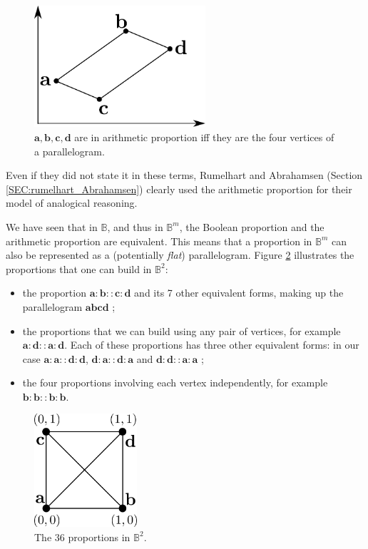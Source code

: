 \begin{figure}[!h]
\centering
  \includegraphics[width=2.5in]{figures/arithmetic_proportion.pdf}
  \caption{$\mathbf{a}, \mathbf{b}, \mathbf{c}, \mathbf{d}$
  are in arithmetic proportion iff they are the four vertices of a
  parallelogram.}
\label{FIG:arithmetic_proportion}
\end{figure}

Even if they did not state it in these terms, Rumelhart and Abrahamsen (Section
\ref{SEC:rumelhart_Abrahamsen}) clearly used the arithmetic proportion for their model of
analogical reasoning.

We have seen that in $\mathbb{B}$, and thus in $\mathbb{B}^m$, the Boolean
proportion and the arithmetic proportion are equivalent. This means that a
proportion in $\mathbb{B}^m$ can also be represented as a (potentially
\textit{flat}) parallelogram.
Figure \ref{FIG:proportions_in_B2} illustrates the proportions that one can
build in $\mathbb{B}^2$:
\begin{itemize}
  \item the proportion $\mathbf{a}: \mathbf{b} :: \mathbf{c} : \mathbf{d}$ and
    its 7 other equivalent forms, making up the parallelogram
    $\mathbf{a}\mathbf{b}\mathbf{c}\mathbf{d}$ ;
  \item the proportions that we can build using any pair of vertices, for
    example $\mathbf{a} : \mathbf{d} :: \mathbf{a} : \mathbf{d}$. Each of these
    proportions has three other equivalent forms: in our case $\mathbf{a} :
    \mathbf{a} :: \mathbf{d} : \mathbf{d}$, $\mathbf{d} : \mathbf{a} ::
    \mathbf{d} : \mathbf{a}$ and $\mathbf{d} : \mathbf{d} :: \mathbf{a} :
    \mathbf{a}$ ;
  \item the four proportions involving each vertex independently, for example
    $\mathbf{b}:\mathbf{b}::\mathbf{b}:\mathbf{b}$.
\end{itemize}

\begin{figure}[!h]
\centering
\includegraphics[width=1.5in]{figures/proportions_in_B2.pdf}
  \caption{The $36$ proportions in $\mathbb{B}^2$.}
\label{FIG:proportions_in_B2}
\end{figure}


